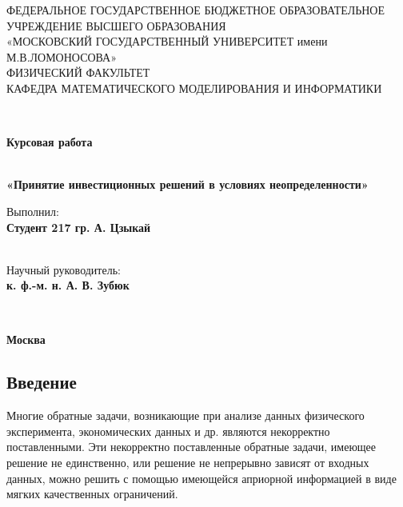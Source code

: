 \documentclass[12pt, a4paper, oneside]{article}
\author{Цзыкай А.}
\renewcommand{\baselinestretch}{1.5}
\begin{document}
\clearpage
	\thispagestyle{empty}
	\renewcommand{\baselinestretch}{0.9}
		\begin{center}\footnotesize
			ФЕДЕРАЛЬНОЕ ГОСУДАРСТВЕННОЕ БЮДЖЕТНОЕ ОБРАЗОВАТЕЛЬНОЕ\\ УЧРЕЖДЕНИЕ ВЫСШЕГО ОБРАЗОВАНИЯ\\
			«МОСКОВСКИЙ ГОСУДАРСТВЕННЫЙ УНИВЕРСИТЕТ имени М.В.ЛОМОНОСОВА»\\
			ФИЗИЧЕСКИЙ ФАКУЛЬТЕТ\\
			КАФЕДРА МАТЕМАТИЧЕСКОГО МОДЕЛИРОВАНИЯ И ИНФОРМАТИКИ
		\end{center}
	\hrulefill
	
	~\\
	\renewcommand{\baselinestretch}{1}
		\begin{center}\Large
			\textbf{Курсовая работа}
			
			~\\
			\LARGE\textbf{«Принятие инвестиционных решений в условиях неопределенности»}\\[300pt]
		\end{center}
	
	
		\begin{flushright}\renewcommand{\baselinestretch}{0.9}
			Выполнил:\\
			\textbf{Студент 217 гр. А. Цзыкай}
			
			~\\
			Научный руководитель:\\
			\textbf{к. ф.-м. н. А. В. Зубюк}
		\end{flushright}
		
		~\\
		\begin{center}
			\textbf{Москва}
		\end{center}

\newpage
	\pagestyle{plain}
	\setcounter{page}{1}
	\tableofcontents
	\setcounter{secnumdepth}{0}

\newpage
	\begin{center}
		\section{Введение}
	\end{center}

	Многие обратные задачи, возникающие при анализе данных физического эксперимента, экономических данных и др. являются некорректно поставленными. Эти некорректно поставленные обратные задачи, имеющее решение не единственно, или решение не непрерывно зависят от входных данных, можно решить с помощью имеющейся априорной информацией в виде мягких качественных ограничений.
	
\end{document}
